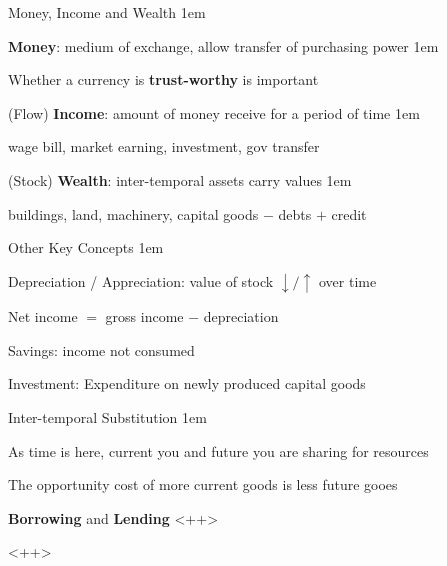\documentclass[11pt,aspectratio=43,usenames,dvipsnames]{beamer}
\let\olditemize=\itemize
\let\endolditemize=\enditemize
\renewenvironment{itemize}{\olditemize \itemsep1em}{\endolditemize}
\theoremstyle{definition}
\begin{document}
\begin{frame}{Money, Income and Wealth}
\label{slide:Money__Income_and_Wealth}
    \begin{itemize}
        \item \textbf{Money}: medium of exchange, allow \alert{transfer} of purchasing power
        \begin{itemize}
            \item Whether a currency is \textbf{trust-worthy} is important
        \end{itemize}
        \item (Flow) \textbf{Income}: amount of money receive for a period of time
        \begin{itemize}
            \item wage bill, market earning, investment, gov transfer
        \end{itemize}
        \item (Stock) \textbf{Wealth}: inter-temporal assets carry values
        \begin{itemize}
            \item buildings, land, machinery, capital goods $ - $ debts $ + $ credit
        \end{itemize}
    \end{itemize}
\end{frame}

\begin{frame}{Other Key Concepts}
\label{slide:Other_Key_Concepts}
    \begin{itemize}
        \item Depreciation / Appreciation: value of stock $ \downarrow / \uparrow  $ over time
        \item Net income $ = $ gross income $ - $ depreciation
        \item Savings: income not consumed
        \item Investment: Expenditure on newly produced capital goods
    \end{itemize}
\end{frame}

\begin{frame}{Inter-temporal Substitution}
\label{slide:Inter_temporal_Substitution}
    \begin{itemize}
        \item As time is here, \alert{current you} and \alert{future you} are sharing for resources
        \item The opportunity cost of \alert{more current goods} is \alert{less future gooes}
        \item \textbf{Borrowing} and \textbf{Lending}
    \end{itemize}
    <++>
\end{frame}
<++>
\end{document}
